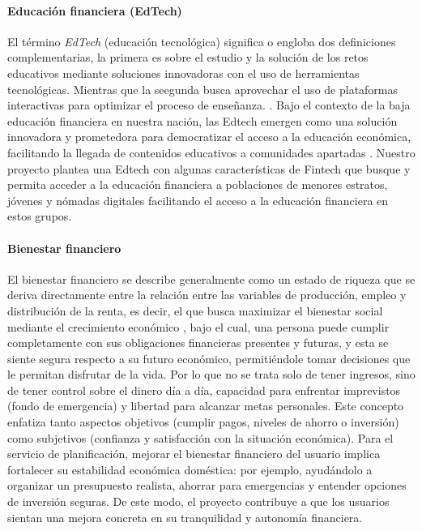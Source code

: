 \paragraph*{Educación financiera (EdTech)}
El término \textit{EdTech} (educación tecnológica) significa o engloba dos definiciones complementarias, la primera es sobre el estudio y la solución de los retos educativos mediante soluciones innovadoras con el uso de herramientas tecnológicas. Mientras que la seegunda busca aprovechar el uso de plataformas interactivas para optimizar el proceso de enseñanza. \parencite{UniversidadEuropea01}. Bajo el contexto de la baja educación financiera en nuestra nación, las Edtech emergen como una solución innovadora y prometedora para democratizar el acceso a la educación económica, facilitando la llegada de contenidos educativos a comunidades apartadas \parencite{LaSillaVacia01}. Nuestro proyecto plantea una Edtech con algunas características de Fintech que busque y permita acceder a la educación financiera a poblaciones de menores estratos, jóvenes y nómadas digitales facilitando el acceso a la educación financiera en estos grupos.

\paragraph*{Bienestar financiero}
El bienestar financiero se describe generalmente como un estado de riqueza que se deriva directamente entre la relación entre las variables de producción, empleo y distribución de la renta, es decir, el que busca maximizar el bienestar social mediante el crecimiento económico \parencite{Economipedia02}, bajo el cual, una persona puede cumplir completamente con sus obligaciones financieras presentes y futuras, y esta se siente segura respecto a su futuro económico, permitiéndole tomar decisiones que le permitan disfrutar de la vida. Por lo que no se trata solo de tener ingresos, sino de tener control sobre el dinero día a día, capacidad para enfrentar imprevistos (fondo de emergencia) y libertad para alcanzar metas personales. Este concepto enfatiza tanto aspectos objetivos (cumplir pagos, niveles de ahorro o inversión) como subjetivos (confianza y satisfacción con la situación económica). Para el servicio de planificación, mejorar el bienestar financiero del usuario implica fortalecer su estabilidad económica doméstica: por ejemplo, ayudándolo a organizar un presupuesto realista, ahorrar para emergencias y entender opciones de inversión seguras. De este modo, el proyecto contribuye a que los usuarios sientan una mejora concreta en su tranquilidad y autonomía financiera.


